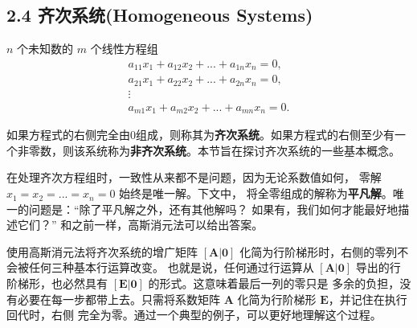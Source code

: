 \subsection{2.4 齐次系统(Homogeneous Systems)}

\(n\) 个未知数的 \(m\) 个线性方程组
\[
\begin{array}{c}
    a_{11}x_1 + a_{12}x_2 + ... + a_{1n}x_n = 0, \\
    a_{21}x_1 + a_{22}x_2 + ... + a_{2n}x_n = 0, \\
    \vdots \\
    a_{m1}x_1 + a_{m2}x_2 + ... + a_{mn}x_n = 0.
\end{array}
\]

如果方程式的右侧完全由0组成，则称其为\textbf{齐次系统}。如果方程式的右侧至少有一个非零数，则该系统称为\textbf{非齐次系统}。本节旨在探讨齐次系统的一些基本概念。

在处理齐次方程组时，一致性从来都不是问题，因为无论系数值如何，
零解 \(x_1 = x_2 = ... = x_n = 0\) 始终是唯一解。下文中，
将全零组成的解称为\textbf{平凡解}。唯一的问题是：“除了平凡解之外，还有其他解吗？
如果有，我们如何才能最好地描述它们？” 和之前一样，高斯消元法可以给出答案。

使用高斯消元法将齐次系统的增广矩阵 \([\mathbf{A|0}]\) 化简为行阶梯形时，右侧的零列不会被任何三种基本行运算改变。
也就是说，任何通过行运算从 \([\mathbf{A|0}]\) 导出的行阶梯形，也必然具有 \([\mathbf{E|0}]\) 的形式。这意味着最后一列的零只是
多余的负担，没有必要在每一步都带上去。只需将系数矩阵 \(\mathbf{A}\) 化简为行阶梯形 \(\mathbf{E}\)，并记住在执行回代时，右侧
完全为零。通过一个典型的例子，可以更好地理解这个过程。

